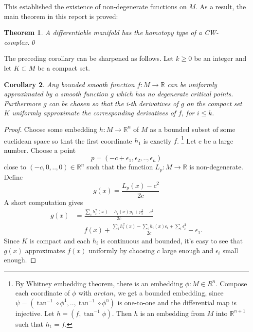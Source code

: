 \documentclass[12pt]{article}
\newtheorem{thm}{Theorem}[section]
\newtheorem{cor}[thm]{Corollary}
\newcommand{\RR}{\mathbb{R}}      %
\begin{document}
This established the existence of non-degenerate functions on $M$. As a result,
the main theorem in this report is proved:

\begin{thm}
  A differentiable manifold has the homotopy type of a CW-complex.\qed
\end{thm}


The preceding corollary can be sharpened as follows. Let $k \ge 0$ be an integer
and let $K \subset M$ be a compact set.

\begin{cor}
  Any bounded smooth function $f: M \to \RR$ can be uniformly approximated by a
  smooth function $g$ which has no degenerate critical points. Furthermore $g$
  can be chosen so that the i-th derivatives of $g$ on the compact set $K$
  uniformly approximate the corresponding derivatives of $f$, for $i \le k$.
\end{cor}

\begin{proof}
  Choose some embedding $h:M \to \RR^n$ of $M$ as a bounded subset of some
  euclidean space so that the first coordinate $h_1$ is exactly
  $f$. \footnote{By Whitney embedding theorem, there is an embedding $\phi : M
    \in R^n$. Compose each coordinate of $\phi$ with $arctan$, we get a bounded
    embedding, since $\psi = (\tan^{-1} \circ \phi^1, .., \tan^{-1} \circ
    \phi^n)$ is one-to-one and the differential map is injective. Let $h = (f,
    \tan^{-1}\phi)$. Then $h$ is an embedding from $M$ into $\RR^{n+1}$ such
    that $h_1 = f$.} Let c be a large number. Choose a point
  \begin{equation}
    p = (-c+\epsilon_1, \epsilon_2, .., \epsilon_n)
  \end{equation}
  close to $(-c, 0, .., 0) \in \RR^n$ such that the function $L_p: M \to \RR$ is
  non-degenerate. Define
  \begin{equation}
    g(x) = \frac{L_p(x)-c^2}{2c}
  \end{equation}
  A short computation gives
  \begin{equation}
    \begin{aligned}
      g(x) &= \frac{\sum_i h_i^2(x)-h_i(x)p_i+p_i^2-c^2}{2c} \\
           &= f(x) + \frac{\sum_i h_i^2(x)-\sum_i h_i(x)\epsilon_i+\sum_i \epsilon_i^2}{2c}-\epsilon_1.
    \end{aligned}
  \end{equation}
  Since $K$ is compact and each $h_i$ is continuous and bounded, it's easy to
  see that $g(x)$ approximates $f(x)$ uniformly by choosing $c$ large enough and
  $\epsilon_i$ small enough. 
\end{proof}
\end{document}
